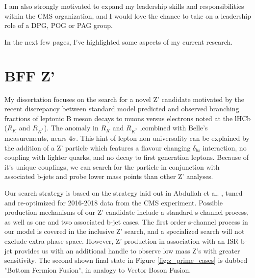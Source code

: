 \documentclass[11pt]{article}
\begin{document}
I am also strongly motivated to expand my leadership skills and responsibilities within the CMS organization, and I would love the chance to take on a leadership role of a DPG, POG or PAG group.


In the next few pages, I've highlighted some aspects of my current research. 

\section{BFF Z'}

My dissertation focuses on the search for a novel Z' candidate motivated by the recent discrepancy between standard model predicted and observed branching fractions of leptonic B meson decays to muons versus electrons noted at the lHCb ($R_K$ and $R_{K^{*}}$). The anomaly in $R_K$ and $R_{K^{*}}$ ,combined with Belle's measurements, nears 4$\sigma$\cite{rkStar}. This hint of lepton non-universality can be explained by the addition of a Z' particle which features a flavour changing $\delta_{bs}$ interaction, no coupling with lighter quarks, and no decay to first generation leptons. Because of it's unique couplings, we can search for the particle in conjunction with associated b-jets and probe lower mass points than other Z' analyses. 

Our search strategy is based on the strategy laid out in Abdullah et al. \cite{PhysRevD.97.075035}, tuned and re-optimized for 2016-2018 data from the CMS experiment. Possible production mechanisms of our Z' candidate include a standard s-channel process, as well as one and two associated b-jet cases. The first order s-channel process in our model is covered in the inclusive Z' search, and a specialized search will not exclude extra phase space. However, Z' production in association with an ISR b-jet provides us with an additional handle to observe low mass Z's with greater sensitivity. The second shown final state in Figure \ref{fig:z_prime_cases} is dubbed "Bottom Fermion Fusion", in analogy to Vector Boson Fusion. 




    \label{fig:ABCD_eqn}
\end{document}
